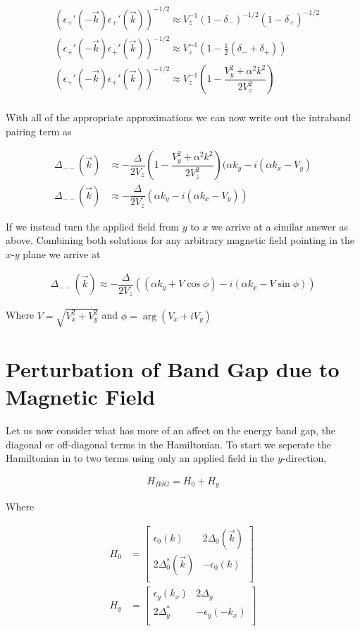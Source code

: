 \begin{align}
  &(\epsilon_+'(-\vec{k})\epsilon_+'(\vec{k}))^{-1/2} \approx V_z^{-1}(1-\delta_-)^{-1/2}(1-\delta_+)^{-1/2} \\
  &(\epsilon_+'(-\vec{k})\epsilon_+'(\vec{k}))^{-1/2} \approx V_z^{-1}(1-\frac{1}{2}(\delta_-+\delta_+)) \\
  &(\epsilon_+'(-\vec{k})\epsilon_+'(\vec{k}))^{-1/2} \approx V_z^{-1}\left(1-\dfrac{V_y^2+\alpha^2k^2}{2V_z^2}\right) \\
\end{align}

With all of the appropriate approximations we can now write out the intraband pairing term as

\begin{align}
  \Delta_{--}(\vec{k}) &\approx -\dfrac{\Delta}{2V_z}\left(1-\dfrac{V_y^2+\alpha^2k^2}{2V_z^2}\right)(\alpha k_y -i(\alpha k_x - V_y) \\
  \Delta_{--}(\vec{k}) &\approx -\dfrac{\Delta}{2V_z}(\alpha k_y - i(\alpha k_x - V_y))
\end{align}

If we instead turn the applied field from $y$ to $x$ we arrive at a similar answer as above. Combining both solutions for any arbitrary magnetic field pointing in the $x$-$y$ plane we arrive at

\begin{align}
  \Delta_{--}(\vec{k}) \approx -\dfrac{\Delta}{2V_z}((\alpha k_y + V\cos{\phi})-i(\alpha k_x - V\sin{\phi}))
\end{align}

Where $V=\sqrt{V_x^2+V_y^2}$ and $\phi=\arg(V_x+iV_y)$

\section{Perturbation of Band Gap due to Magnetic Field}

Let us now consider what has more of an affect on the energy band gap, the diagonal or off-diagonal terms in the Hamiltonian. To start we seperate the Hamiltonian in to two terms using only an applied field in the $y$-direction,

\begin{align}
  H_{BdG} = H_0 + H_y
\end{align}

Where

\begin{align}
  H_0 &=
  \begin{bmatrix}
    \epsilon_0(k) & 2\Delta_0(\vec{k}) \\
    2\Delta_0^*(\vec{k}) & -\epsilon_0(k) \\
  \end{bmatrix} \\
  H_y &=
  \begin{bmatrix}
    \epsilon_y(k_x) & 2\Delta_y \\
    2\Delta_y^* & -\epsilon_y(-k_x) \\
  \end{bmatrix}
\end{align}

